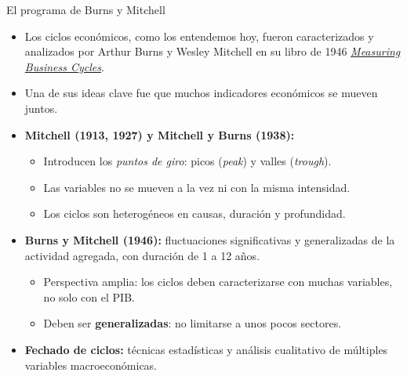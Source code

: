 \documentclass[aspectratio=169,11pt]{beamer}
\begin{document}
\begin{frame}{El programa de Burns y Mitchell}
  \begin{itemize}
    \item Los ciclos económicos, como los entendemos hoy, fueron caracterizados y analizados por Arthur Burns y Wesley Mitchell en su libro de 1946 \href{https://www.nber.org/system/files/chapters/c2980/c2980.pdf}{\textit{Measuring Business Cycles}}.
    \item Una de sus ideas clave fue que muchos indicadores económicos se mueven juntos.
    \item \textbf{Mitchell (1913, 1927) y Mitchell y Burns (1938):}
          \begin{itemize}
            \item Introducen los \textit{puntos de giro}: picos (\textit{peak}) y valles (\textit{trough}).
            \item Las variables no se mueven a la vez ni con la misma intensidad.
            \item Los ciclos son heterogéneos en causas, duración y profundidad.
          \end{itemize}
    \item \textbf{Burns y Mitchell (1946):} fluctuaciones significativas y generalizadas de la actividad agregada, con duración de 1 a 12 años.
          \begin{itemize}
            \item Perspectiva amplia: los ciclos deben caracterizarse con muchas variables, no solo con el PIB.
            \item Deben ser \textbf{generalizadas}: no limitarse a unos pocos sectores.
          \end{itemize}
    \item \textbf{Fechado de ciclos:} técnicas estadísticas y análisis cualitativo de múltiples variables macroeconómicas.
  \end{itemize}
\end{frame}
\end{document}
